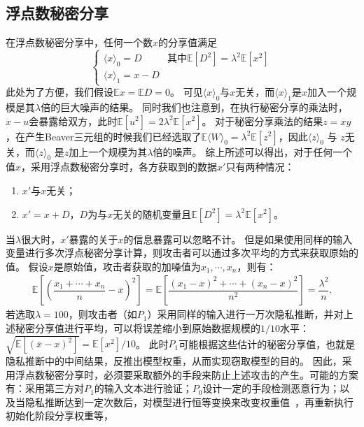 \subsection{浮点数秘密分享}
在浮点数秘密分享中，任何一个数$x$的分享值满足
\begin{equation}
\begin{cases}
    \langle x \rangle_0 = D & \text{其中} \mathbb E[D^2] = \lambda^2 \mathbb E[x^2] \\
    \langle x \rangle_1 = x - D
\end{cases}
\end{equation}
此处为了方便，我们假设$\mathbb Ex = \mathbb ED = 0$。
%
可见$\langle x \rangle_0$与$x$无关，而$\langle x \rangle_1$是$x$加入一个规模是其$\lambda$倍的巨大噪声的结果。
%
同时我们也注意到，在执行秘密分享的乘法时，$x - u$会暴露给双方，此时$\mathbb E[u^2] = 2\lambda^2 \mathbb E[x^2]$。
%
对于秘密分享乘法的结果$z = xy$，在产生Beaver三元组的时候我们已经选取了$\mathbb E \langle W \rangle_0 = \lambda^2 \mathbb E[z^2]$，因此$\langle z \rangle_0$ 与 $z$无关，而$\langle z \rangle_0$ 是$z$加上一个规模为其$\lambda$倍的噪声。
%
综上所述可以得出，对于任何一个值$x$，采用浮点数秘密分享时，各方获取到的数据$x'$只有两种情况：
\begin{enumerate}
    \item $x'$与$x$无关；
    \item $x' = x + D$，$D$为与$x$无关的随机变量且$\mathbb E[D^2] = \lambda^2 \mathbb E[x^2]$。
\end{enumerate}
%
当$\lambda$很大时，$x'$暴露的关于$x$的信息暴露可以忽略不计。
%
但是如果使用同样的输入变量进行多次浮点秘密分享计算，则攻击者可以通过多次平均的方式来获取原始的值。
%
假设$x$是原始值，攻击者获取的加噪值为$x_1, \cdots, x_n$，则有：
\begin{equation}
\begin{split}
    \mathbb E\left[\left(\dfrac{x_1 + \cdots + x_n}{n} - x \right)^2 \right] = 
    \mathbb E\left[\dfrac{(x_1 - x)^2 + \cdots + (x_n - x)^2}{n^2} \right] =
    \dfrac{\lambda^2}{n}.
\end{split}
\end{equation}
%
若选取$\lambda = 100$，则攻击者（如$P_1$）采用同样的输入进行一万次隐私推断，并对上述秘密分享值进行平均，可以将误差缩小到原始数据规模的$1/10$水平：
$\sqrt{\mathbb E[(\bar x - x)^2]} = {\mathbb E[x^2]}/{10}$。
%
此时$P_1$可能根据这些估计的秘密分享值，也就是隐私推断中的中间结果，反推出模型权重，从而实现窃取模型的目的。
%
因此，采用浮点数秘密分享时，必须要采取额外的手段来防止上述攻击的产生。可能的方案有：采用第三方对$P_1$的输入文本进行验证；$P_0$设计一定的手段检测恶意行为；以及当隐私推断达到一定次数后，对模型进行恒等变换来改变权重值~\cite{xuhengyuan_2024_permutation_transformer}，再重新执行初始化阶段分享权重等，
%


